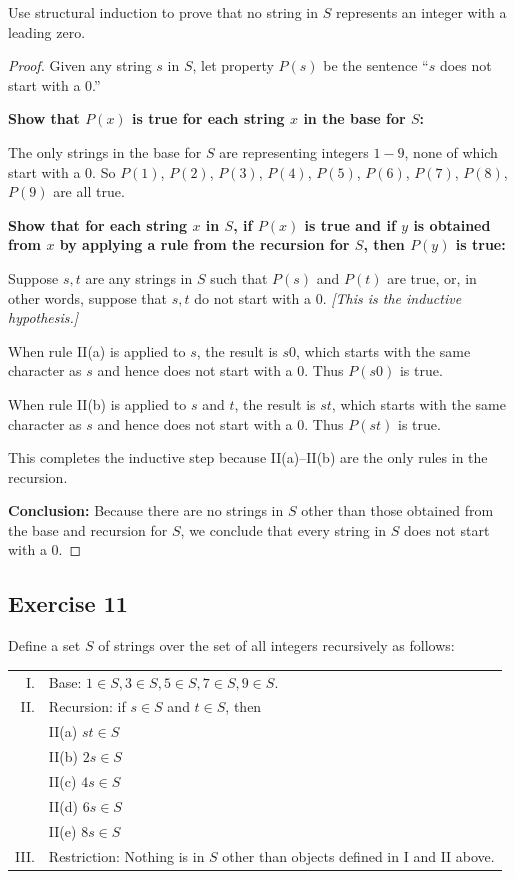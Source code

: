 \documentclass[14pt]{extarticle}
\begin{document}
Use structural induction to prove that no string in $S$ represents an integer with a leading zero.

\begin{proof}
Given any string $s$ in $S$, let property $P(s)$ be the sentence “$s$ does not start with a 0.” 

{\bf Show that $P(x)$ is true for each string $x$ in the base for $S$:}

The only strings in the base for $S$ are representing integers $1-9$, none of which start with a 0. So $P(1)$, 
$P(2)$, $P(3)$, $P(4)$, $P(5)$, $P(6)$, $P(7)$, $P(8)$, $P(9)$ are all true. 

{\bf Show that for each string $x$ in $S$, if $P(x)$ is true and if $y$ is obtained from $x$ by applying a rule 
from the recursion for $S$, then $P(y)$ is true:}

Suppose $s, t$ are any strings in $S$ such that $P(s)$ and $P(t)$ are true, or, in other words, suppose that $s, t$ do 
not start with a 0. {\it [This is the inductive hypothesis.]} 

When rule II(a) is applied to $s$, the result is $s0$, which starts with the same character as $s$ and hence does 
not start with a 0. Thus $P(s0)$ is true.

When rule II(b) is applied to $s$ and $t$, the result is $st$, which starts with the same character as $s$ and hence 
does not start with a 0. Thus $P(st)$ is true.

This completes the inductive step because II(a)–II(b) are the only rules in the recursion.

{\bf Conclusion:} Because there are no strings in $S$ other than those obtained from the base and recursion for $S$, we 
conclude that every string in $S$ does not start with a 0.
\end{proof}

\subsection{Exercise 11}
Define a set $S$ of strings over the set of all integers recursively as follows:

\begin{tabular}{rl}
I. & Base: $1 \in S, 3 \in S, 5 \in S, 7 \in S, 9 \in S$. \\
II. & Recursion: if $s \in S$ and $t \in S$, then \\
    & II(a) $st \in S$ \\
    & II(b) $2s \in S$ \\
    & II(c) $4s \in S$ \\
    & II(d) $6s \in S$ \\
    & II(e) $8s \in S$ \\
III. & Restriction: Nothing is in $S$ other than objects defined in I and II above.
\end{tabular}
\end{document}
